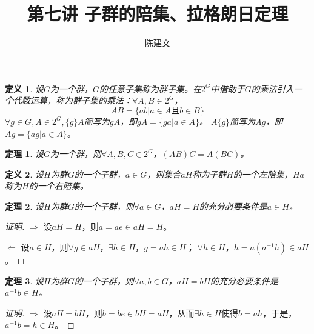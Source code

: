 \documentclass{article}
\newtheorem{Def}{定义}
\newtheorem{Thm}{定理}
\begin{document}
\begin{CJK*}{UTF8}{gbsn}
  \title{第七讲 子群的陪集、拉格朗日定理}
  \author{陈建文}
  \maketitle
  
  \begin{Def}
    设$G$为一个群，$G$的任意子集称为群子集。在$2^G$中借助于$G$的乘法引入一个代数运算，称为群子集的乘法：$\forall A,B\in 2^G$，
    \[AB=\{ab|a\in A \text{且} b\in B\}\]
    $\forall g\in G,A\in 2^G,\{g\}A$简写为$gA$，即$gA=\{ga|a\in A\}$。
    $A\{g\}$简写为$Ag$，即$Ag=\{ag|a\in A\}$。
  \end{Def}
  \begin{Thm}
    设$G$为一个群，则$\forall A,B,C\in 2^G$，$(AB)C=A(BC)$。
  \end{Thm}
\begin{Def}
  设$H$为群$G$的一个子群，$a\in G$，则集合$aH$称为子群$H$的一个左陪集，$Ha$称为$H$的一个右陪集。
\end{Def}

\begin{Thm}
  设$H$为群$G$的一个子群，则$\forall a\in G$，$aH=H$的充分必要条件是$a\in H$。
\end{Thm}
\begin{proof}[证明]
$\Rightarrow$
设$aH=H$，则$a=ae\in aH=H$。

$\Leftarrow$
设$a\in H$，则$\forall g\in aH$，$\exists h\in H$，$g=ah\in H$；
$\forall h\in H$，$h=a(a^{-1}h)\in aH$。
\end{proof}
\begin{Thm}
  设$H$为群$G$的一个子群，则$\forall a,b\in G$，$aH=bH$的充分必要条件是$a^{-1}b\in H$。
\end{Thm}
\begin{proof}[证明]
  $\Rightarrow$
  设$aH=bH$，则$b=be\in bH=aH$，从而$\exists h\in H$使得$b=ah$，于是，$a^{-1}b=h\in H$。


\end{proof}
\end{CJK*}
\end{document}
